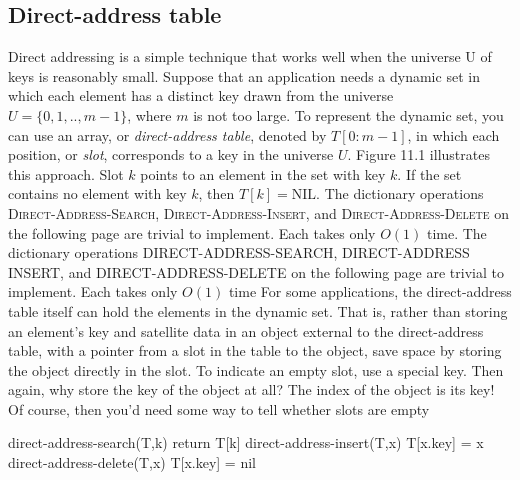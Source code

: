 \documentclass{report}
\begin{document}
\bigbreak \noindent 
\subsection{Direct-address table}
\bigbreak \noindent 
Direct addressing is a simple technique that works well when the universe U of
keys is reasonably small. Suppose that an application needs a dynamic set in which
each element has a distinct key drawn from the universe $U = \{0,1,..,m-1\} $, where $m$ is not too large.
\bigbreak \noindent 
To represent the dynamic set, you can use an array, or \textit{direct-address table}, denoted by \( T[0 : m - 1] \), in which each position, or \textit{slot}, corresponds to a key in the universe \( U \). Figure 11.1 illustrates this approach. Slot \( k \) points to an element in the set with key \( k \). If the set contains no element with key \( k \), then \( T[k] = \text{NIL} \).
\bigbreak \noindent 
The dictionary operations \textsc{Direct-Address-Search}, \textsc{Direct-Address-Insert}, and \textsc{Direct-Address-Delete} on the following page are trivial to implement. Each takes only \( O(1) \) time.
\bigbreak \noindent 
The dictionary operations DIRECT-ADDRESS-SEARCH, DIRECT-ADDRESS INSERT, and DIRECT-ADDRESS-DELETE on the following page are trivial to implement. Each takes only $O(1)$ time
\bigbreak \noindent 
For some applications, the direct-address table itself can hold the elements in the dynamic set. That is, rather than storing an element’s key and satellite data in an object external to the direct-address table, with a pointer from a slot in the table to the object, save space by storing the object directly in the slot. To indicate an empty slot, use a special key. Then again, why store the key of the object at all? The index of the object is its key! Of course, then you’d need some way to tell whether slots are empty
\bigbreak \noindent 
{}
\bigbreak \noindent 
\begin{cppcode}
direct-address-search(T,k) 
    return T[k]
direct-address-insert(T,x)
    T[x.key] = x
direct-address-delete(T,x)
    T[x.key] = nil
\end{cppcode}

\bigbreak \noindent 
\end{document}
